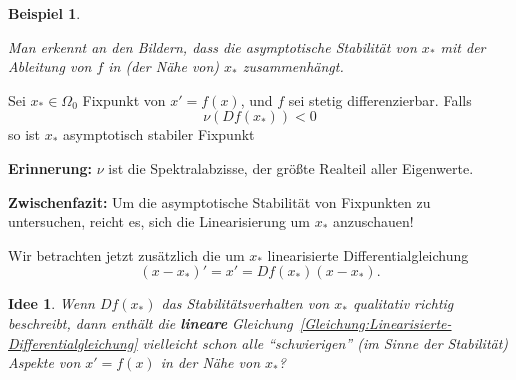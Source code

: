 \documentclass[german]{scrreprt}
\let\emph\textbf
\theoremstyle{plain}
\theoremstyle{nonumberplain}
\theoremstyle{nonumberplain}
\newtheorem{bsp}{Beispiel}
\newtheorem{idea}{Idee}
\theoremstyle{nonumberplain}
\begin{document}
\begin{bsp} ~
	\begin{center}
		\hspace{0.1\textwidth}%
	\end{center}
	Man erkennt an den Bildern, dass die asymptotische Stabilität von $x_*$ mit der Ableitung von $f$ in (der Nähe von) $x_*$ zusammenhängt. 
\end{bsp}


\begin{satz}
	Sei $x_* \in \Omega_0$ Fixpunkt von $x' = f(x)$, und $f$ sei stetig differenzierbar. Falls
	\begin{equation*}
	\nu(Df(x_*)) < 0
	\end{equation*}
	so ist $x_*$ asymptotisch stabiler Fixpunkt
\end{satz}

\textbf{Erinnerung:} $\nu$ ist die Spektralabzisse, der größte Realteil aller Eigenwerte.

\textbf{Zwischenfazit:} Um die asymptotische Stabilität von Fixpunkten zu untersuchen, reicht es, sich die Linearisierung um $ x_* $ anzuschauen!

Wir betrachten jetzt zusätzlich die um $ x_* $ linearisierte Differentialgleichung
\begin{equation}\label{Gleichung:Linearisierte-Differentialgleichung}
(x-x_*)' = x' = Df(x_*)(x-x_*).
\end{equation}

\begin{idea}
	Wenn $Df(x_*)$ das Stabilitätsverhalten von $x_*$ qualitativ richtig beschreibt, dann enthält die \emph{lineare} Gleichung~\eqref{Gleichung:Linearisierte-Differentialgleichung}
	vielleicht schon alle \enquote{schwierigen} (im Sinne der Stabilität) Aspekte von $ x'=f(x)$ in der Nähe von $ x_* $?
\end{idea}
\end{document}
